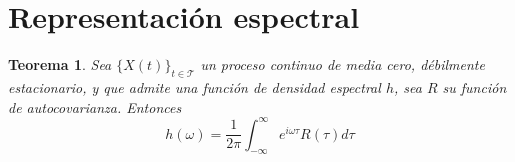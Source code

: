\documentclass[12pt,letterpaper,draft]{book}
\newtheorem{teorema}{Teorema}[chapter]
\newcommand{\intR}{\int_{-\infty}^{\infty}}
\newcommand{\xt}{$\{X(t)\}_{t\in \mathcal{T}}$ }
\begin{document}

\section{Representación espectral}
\label{sec:representacion}

\begin{teorema}
Sea \xt un proceso continuo de media cero, débilmente estacionario, y que admite una función de densidad espectral $h$, sea $R$ su función de autocovarianza. Entonces
\begin{equation}
h(\omega) = \frac{1}{2\pi} \intR e^{i \omega \tau} R(\tau) d\tau
\end{equation}
\label{teo:corr_four}
\end{teorema}
\end{document}
